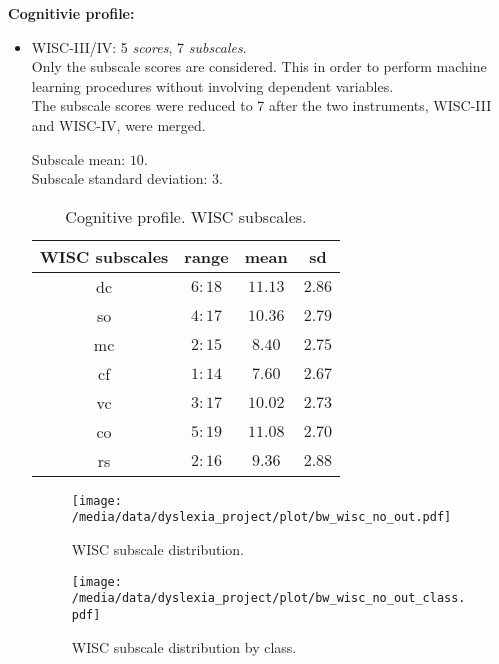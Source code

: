 \documentclass[11pt, a4paper, twoside, openright]{article}
\begin{document}
\textbf{Cognitivie profile:}\\
\begin{itemize}
\item WISC-III/IV: 5 \emph{scores}, 7 \emph{subscales}.\\
  Only the subscale scores are considered. This in order to perform
  machine learning procedures without involving dependent variables.\\
  The subscale scores were reduced to 7 after the two instruments,
  WISC-III and WISC-IV, were merged.

  Subscale mean: $10$.\\
  Subscale standard deviation: $3$.
\begin{table}[h!]
\begin{center}
  \begin{tabular}{|c|c|c|c|}
    \hline
    WISC subscales & range & mean & sd\\
    \hline \hline
    dc & $6:18$&$11.13$&$2.86$\\
    \hline
    so & $4:17$&$10.36$&$2.79$\\
    \hline
    mc & $2:15$&$8.40$&$2.75$\\
    \hline
    cf & $1:14$&$7.60$&$2.67$\\
    \hline
    vc & $3:17$&$10.02$&$2.73$\\
    \hline
    co & $5:19$&$11.08$&$2.70$\\
    \hline
    rs & $2:16$&$9.36$&$2.88$\\
    \hline
  \end{tabular}
\end{center}
\caption{Cognitive profile. WISC subscales.}
\label{tab:2}
\end{table}

\begin{figure}[h!] 
\centering
\texttt{[image: /media/data/dyslexia\_project/plot/bw\_wisc\_no\_out.pdf]}
\caption{WISC subscale distribution.}
\label{fig:2}
\end{figure}

\begin{figure}[h!] 
\centering
\texttt{[image: /media/data/dyslexia\_project/plot/bw\_wisc\_no\_out\_class.pdf]}
\caption{WISC subscale distribution by class.}
\label{fig:3}
\end{figure}

\clearpage


\end{itemize}
\end{document}
